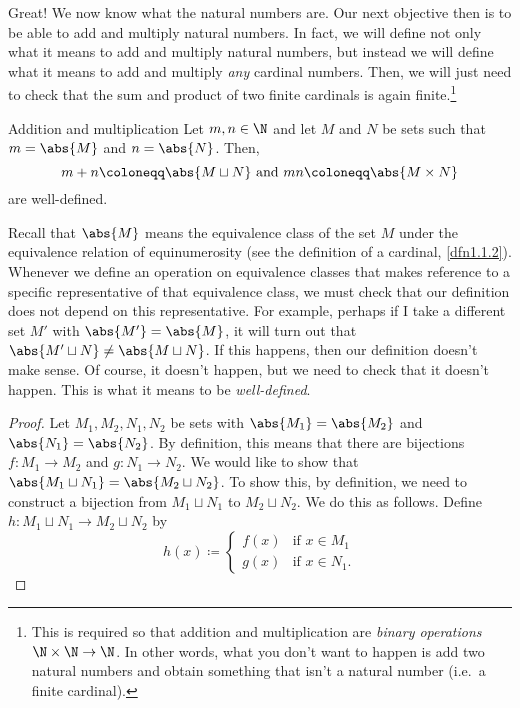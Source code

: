 Great!  We now know what the natural numbers are.  Our next objective then is to be able to add and multiply natural numbers.  In fact, we will define not only what it means to add and multiply natural numbers, but instead we will define what it means to add and multiply \emph{any} cardinal numbers.  Then, we will just need to check that the sum and product of two finite cardinals is again finite.\footnote{This is required so that addition and multiplication are \emph{binary operations} $\N \times \N \rightarrow \N$.  In other words, what you don't want to happen is add two natural numbers and obtain something that isn't a natural number (i.e.~a finite cardinal).}
\begin{prp}{Addition and multiplication}{}
Let $m,n\in \N$ and let $M$ and $N$ be sets such that $m=\abs{M}$ and $n=\abs{N}$.  Then,
\begin{equation}
m+n\coloneqq \abs{M\sqcup N}\text{ and }mn\coloneqq \abs{M\times N}
\end{equation}
are well-defined.
\begin{rmk}
Recall that $\abs{M}$ means the equivalence class of the set $M$ under the equivalence relation of equinumerosity (see the definition of a cardinal, \cref{dfn1.1.2}).  Whenever we define an operation on equivalence classes that makes reference to a specific representative of that equivalence class, we must check that our definition does not depend on this representative.  For example, perhaps if I take a different set $M'$ with $\abs{M'}=\abs{M}$, it will turn out that $\abs{M'\sqcup N}\neq \abs{M\sqcup N}$.  If this happens, then our definition doesn't make sense.  Of course, it doesn't happen, but we need to check that it doesn't happen.  This is what it means to be \emph{well-defined}.
\end{rmk}
\begin{proof}
Let $M_1,M_2,N_1,N_2$ be sets with $\abs{M_1}=\abs{M_2}$ and $\abs{N_1}=\abs{N_2}$.  By definition, this means that there are bijections $f\colon M_1\rightarrow M_2$ and $g\colon N_1\rightarrow N_2$.  We would like to show that $\abs{M_1\sqcup N_1}=\abs{M_2\sqcup N_2}$.  To show this, by definition, we need to construct a bijection from $M_1\sqcup N_1$ to $M_2\sqcup N_2$.  We do this as follows.  Define $h \colon M_1\sqcup N_1\rightarrow M_2\sqcup N_2$ by
\begin{equation}
h(x)\coloneqq \begin{cases}f(x) & \text{if }x\in M_1 \\ g(x) & \text{if }x\in N_1.\end{cases}
\end{equation}


\end{proof}
\end{prp}
